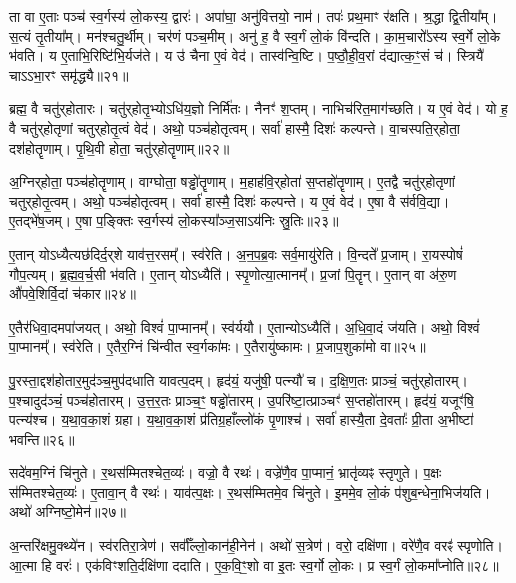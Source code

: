    ता वा ए॒ताः पञ्च॑ स्व॒र्गस्य॑ लो॒कस्य॒ द्वारः॑।
   अपा॑घा॒ अनु॑वित्तयो॒ नाम॑।
   तपः॑ प्रथ॒माꣳ र॑क्षति।
   श्र॒द्धा द्वि॒तीया᳚म्।
   स॒त्यं तृ॒तीया᳚म्।
   मन॑श्चतु॒र्थीम्।
   चर॑णं पञ्च॒मीम्।
   अनु॑ ह॒ वै स्व॒र्गं लो॒कं वि॑न्दति।
   का॒म॒चारो᳚ऽस्य स्व॒र्गे लो॒के भ॑वति।
   य ए॒ताभि॒रिष्टि॑भि॒र्यज॑ते।
   य उ॑ चैना ए॒वं वेद॑।
   तास्व॑न्वि॒ष्टि।
   प॒ष्ठौ॒ही॒व॒रां द॑द्यात्क॒ꣳ॒सं च॑।
   स्त्रियै॑ चाऽऽभा॒रꣳ समृ॑द्ध्यै॥२१॥\anuvakamend
  
   ब्रह्म॒ वै चतु॑र्‌होतारः।
   चतु॑र्‌होतृ॒भ्योऽधि॑य॒ज्ञो निर्मि॑तः।
   नैनꣳ॑ श॒प्तम्।
   नाभिच॑रित॒माग॑च्छति।
   य ए॒वं वेद॑।
   यो ह॒ वै चतु॑र्‌होतृणां चतुर्‌होतृ॒त्वं वेद॑।
   अथो॒ पञ्च॑होतृत्वम्।
   सर्वा॑ हास्मै॒ दिशः॑ कल्पन्ते।
   वा॒चस्पति॒र्‌होता॒ दश॑होतॄणाम्।
   पृ॒थि॒वी होता॒ चतु॑र्‌होतॄणाम्॥२२॥

   अ॒ग्निर्‌होता॒ पञ्च॑होतॄणाम्।
   वाग्घोता॒ षड्ढो॑तॄणाम्।
   म॒हाह॑वि॒र्‌होता॑ स॒प्तहो॑तॄणाम्।
   ए॒तद्वै चतु॑र्‌होतृणां चतुर्‌होतृ॒त्वम्।
   अथो॒ पञ्च॑होतृत्वम्।
   सर्वा॑ हास्मै॒ दिशः॑ कल्पन्ते।
   य ए॒वं वेद॑।
   ए॒षा वै स॑र्ववि॒द्या।
   ए॒तद्भे॑ष॒जम्।
   ए॒षा प॒ङ्क्तिः स्व॒र्गस्य॑ लो॒कस्या᳚ञ्ज॒साऽय॑निः स्रु॒तिः॥२३॥

   ए॒तान् योऽध्यैत्यछ॑दिर्द॒र्‌शे याव॑त्त॒रसम्᳚।
   स्व॑रेति।
   अ॒न॒प॒ब्र॒वः सर्व॒मायु॑रेति।
   वि॒न्दते᳚ प्र॒जाम्।
   रा॒यस्पोषं॑ गौप॒त्यम्।
   ब्र॒ह्म॒व॒र्च॒सी भ॑वति।
   ए॒तान् योऽध्यैति॑।
   स्पृ॒णोत्या॒त्मानम्᳚।
   प्र॒जां पि॒तॄन्।
   ए॒तान् वा अ॑रु॒ण औ॑पवे॒शिर्वि॒दां च॑कार॥२४॥

   ए॒तैर॑धिवा॒दमपा॑जयत्।
   अथो॒ विश्वं॑ पा॒प्मानम्᳚।
   स्व॑र्ययौ।
   ए॒तान्योऽध्यैति॑।
   अ॒धि॒वा॒दं ज॑यति।
   अथो॒ विश्वं॑ पा॒प्मानम्᳚।
   स्व॑रेति।
   ए॒तैर॒ग्निं चि॑न्वीत स्व॒र्गका॑मः।
   ए॒तैरायु॑ष्कामः।
   प्र॒जाप॒शुका॑मो वा॥२५॥

   पु॒रस्ता॒द्दश॑होतार॒मुद॑ञ्च॒मुप॑दधाति यावत्प॒दम्।
   हृद॑यं॒ यजु॑षी॒ पत्न्यौ॑ च।
   द॒क्षि॒ण॒तः प्राञ्चं॒ चतु॑र्‌होतारम्।
   प॒श्चादुद॑ञ्चं॒ पञ्च॑होतारम्।
   उ॒त्त॒र॒तः प्राञ्च॒ꣳ॒ षड्ढो॑तारम्।
   उ॒परि॑ष्टा॒त्प्राञ्चꣳ॑ स॒प्तहो॑तारम्।
   हृद॑यं॒ यजूꣳ॑षि॒ पत्न्य॑श्च।
   य॒था॒व॒का॒शं ग्रहा\sn{}।
   य॒था॒व॒का॒शं प्र॑तिग्र॒हाँल्लो॑कं  पृ॒णाश्च॑।
   सर्वा॑ हास्यै॒ता दे॒वताः᳚ प्री॒ता अ॒भीष्टा॑ भवन्ति॥२६॥

   सदे॑वम॒ग्निं चि॑नुते।
   र॒थस॑म्मितश्चेत॒व्यः॑।
   वज्रो॒ वै रथः॑।
   वज्रे॑णै॒व पा॒प्मानं॒ भ्रातृ॑व्यꣴ स्तृणुते।
   प॒क्षः स॑म्मितश्चेत॒व्यः॑।
   ए॒तावा॒न् वै रथः॑।
   याव॑त्प॒क्षः।
   र॒थस॑म्मितमे॒व चि॑नुते।
   इ॒ममे॒व लो॒कं प॑शुब॒न्धेना॒भिज॑यति।
   अथो॑ अग्निष्टो॒मेन॑॥२७॥

   अ॒न्तरि॑क्षमु॒क्थ्ये॑न।
   स्व॑रतिरा॒त्रेण॑।
   सर्वाँ᳚ल्लो॒कान॑ही॒नेन॑।
   अथो॑ स॒त्रेण॑।
   वरो॒ दक्षि॑णा।
   वरे॑णै॒व वरꣴ॑ स्पृणोति।
   आ॒त्मा हि वरः॑।
   एक॑विꣳशति॒र्दक्षि॑णा ददाति।
   ए॒क॒वि॒ꣳ॒शो वा इ॒तः स्व॒र्गो लो॒कः।
   प्र स्व॒र्गं लो॒कमा᳚प्नोति॥२८॥

